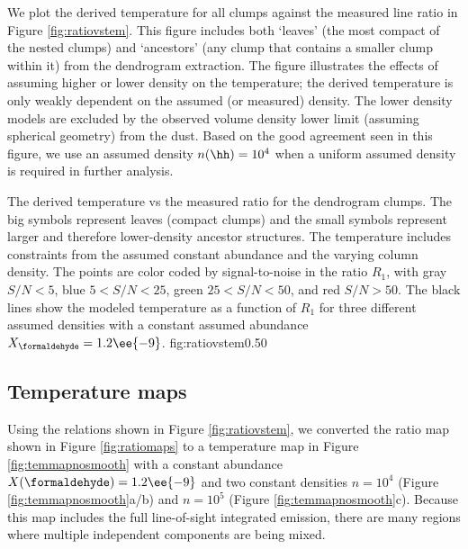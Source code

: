 We plot the derived temperature for all clumps against the measured line ratio
in Figure \ref{fig:ratiovstem}.  This figure includes both `leaves' (the most
compact of the nested clumps) and `ancestors' (any clump that contains a
smaller clump within it)
from the dendrogram extraction.  The figure illustrates the effects of assuming
higher or lower density on the temperature; the derived temperature is only weakly dependent
on the assumed (or measured) density. The lower density models are excluded by
the observed volume density lower limit (assuming spherical geometry) from the
dust.  Based on the good agreement seen in this figure, we use an assumed
density $n(\hh)=10^4$ \percc when a uniform assumed density is required in
further analysis.

{The derived temperature vs the measured ratio \Rone for the dendrogram clumps.
The big symbols represent leaves (compact clumps) and the small symbols
represent larger and therefore lower-density ancestor structures.
The temperature includes constraints from the assumed constant \formaldehyde
abundance and the 
varying column density.  The points are color coded by signal-to-noise in the
ratio $R_1$, with gray $S/N < 5$, blue $5 < S/N < 25$, green $25 < S/N < 50$,
and red $S/N > 50$.  The black lines show the modeled temperature as a function of
$R_1$ for three different assumed densities with a constant assumed abundance
$X_{\formaldehyde} = 1.2\ee{-9}$.
}
{fig:ratiovstem}{0.5}{0}

\subsection{Temperature maps}
\label{sec:formaldehydetemmap}
Using the relations shown in Figure \ref{fig:ratiovstem}, we converted the
ratio map shown in Figure \ref{fig:ratiomaps} to a temperature map in Figure
\ref{fig:temmapnosmooth} with a constant abundance $X(\formaldehyde)=1.2\ee{-9}$ 
and two constant densities $n=10^4$ (Figure \ref{fig:temmapnosmooth}a/b) and
$n=10^5$ \percc (Figure \ref{fig:temmapnosmooth}c).  Because this map includes
the full line-of-sight integrated emission, there are many regions where
multiple independent components are being mixed.


